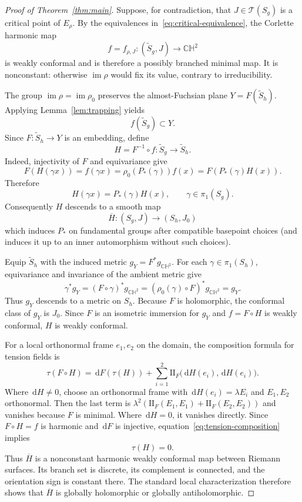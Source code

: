 \documentclass[10pt,a4paper]{amsart}
\newcommand{\CH}{\mathbb{CH}}
\newcommand{\II}{\mathrm{II}}
\newcommand{\Teich}{\mathcal T}
\newcommand{\dd}{\,\mathrm d}
\newcommand{\im}{\operatorname{im}}
\begin{document}
\begin{proof}[Proof of Theorem~\ref{thm:main}]
Suppose, for contradiction, that $J\in\Teich(S_g)$ is a critical point of
$E_\rho$.  By the equivalences in~\eqref{eq:critical-equivalence}, the
Corlette harmonic map
\[
f=f_{\rho,J}:(\widetilde S_g,J)\longrightarrow\CH^2
\]
is weakly conformal and is therefore a possibly branched minimal map.  It is
nonconstant: otherwise $\im\rho$ would fix its value, contrary to
irreducibility.

The group $\im\rho=\im\rho_0$ preserves the almost-Fuchsian plane
$Y=F(\widetilde S_h)$.  Applying Lemma~\ref{lem:trapping} yields
\begin{equation}\label{eq:image-in-Y}
 f(\widetilde S_g)\subset Y.
\end{equation}
Since $F:\widetilde S_h\to Y$ is an embedding, define
\[
 H=F^{-1}\circ f:\widetilde S_g\longrightarrow\widetilde S_h.
\]
Indeed, injectivity of $F$ and equivariance give
\[
 F(H(\gamma x))=f(\gamma x)=\rho_0(P_*(\gamma))f(x)
 =F(P_*(\gamma)H(x)).
\]
Therefore
\begin{equation}\label{eq:H-equivariance}
 H(\gamma x)=P_*(\gamma)H(x),
 \qquad \gamma\in\pi_1(S_g).
\end{equation}
Consequently $H$ descends to a smooth map
\begin{equation}\label{eq:Hbar}
 \overline H:(S_g,J)\longrightarrow(S_h,J_0)
\end{equation}
which induces $P_*$ on fundamental groups after compatible basepoint choices
(and induces it up to an inner automorphism without such choices).

Equip $\widetilde S_h$ with the induced metric $g_Y=F^*g_{\CH^2}$.  For each
$\gamma\in\pi_1(S_h)$, equivariance and invariance of the ambient metric give
\[
 \gamma^*g_Y=(F\circ\gamma)^*g_{\CH^2}
 =(\rho_0(\gamma)\circ F)^*g_{\CH^2}=g_Y.
\]
Thus $g_Y$ descends to a metric on $S_h$.  Because $F$ is holomorphic, the
conformal class of $g_Y$ is $J_0$.  Since $F$ is an isometric immersion for
$g_Y$ and $f=F\circ H$ is weakly conformal, $H$ is weakly conformal.

For a local orthonormal frame $e_1,e_2$ on the domain, the composition
formula for tension fields is
\begin{equation}\label{eq:tension-composition}
 \tau(F\circ H)=\dd F(\tau(H))+
 \sum_{i=1}^2\II_F\bigl(\dd H(e_i),\dd H(e_i)\bigr).
\end{equation}
Where $\dd H\ne0$, choose an orthonormal frame with
$\dd H(e_i)=\lambda E_i$ and $E_1,E_2$ orthonormal.  Then the last term is
$\lambda^2(\II_F(E_1,E_1)+\II_F(E_2,E_2))$ and vanishes because $F$ is
minimal.  Where $\dd H=0$, it vanishes directly.  Since $F\circ H=f$ is
harmonic and $\dd F$ is injective, equation~\eqref{eq:tension-composition}
implies
\[
 \tau(H)=0.
\]
Thus $\overline H$ is a nonconstant harmonic weakly conformal map between
Riemann surfaces.  Its branch set is discrete, its complement is connected,
and the orientation sign is constant there.  The standard local
characterization therefore shows that $\overline H$ is globally holomorphic
or globally antiholomorphic.


\end{proof}
\end{document}
